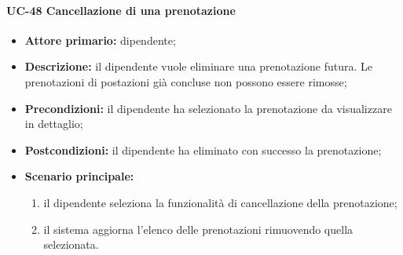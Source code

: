 \paragraph{UC-48 Cancellazione di una prenotazione}

    \begin{itemize}
        \item \textbf{Attore primario:} dipendente;

        \item \textbf{Descrizione:} il dipendente vuole eliminare una prenotazione futura. Le prenotazioni di postazioni già concluse non possono essere rimosse;

        \item \textbf{Precondizioni:} il dipendente ha selezionato la prenotazione da visualizzare in dettaglio;

        \item \textbf{Postcondizioni:} il dipendente ha eliminato con successo la prenotazione;

        \item \textbf{Scenario principale:}
            \begin{enumerate}
                \item il dipendente seleziona la funzionalità di cancellazione della prenotazione;
                \item il sistema aggiorna l'elenco delle prenotazioni rimuovendo quella selezionata.
            \end{enumerate}
    \end{itemize} 

